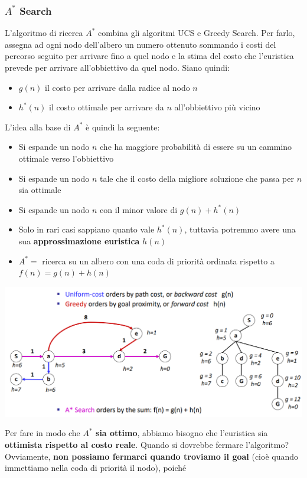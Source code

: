 \documentclass[12pt]{article}
\begin{document}
\subsubsection{$A^*$ Search}
L'algoritmo di ricerca $A^*$ combina gli algoritmi UCS e Greedy Search.
Per farlo, assegna ad ogni nodo dell'albero un numero ottenuto sommando i costi del percorso seguito per arrivare fino a quel nodo e la stima del costo che
l'euristica prevede per arrivare all'obbiettivo da quel nodo.
Siano quindi:
\begin{itemize}
    \item $g(n)$ il costo per arrivare dalla radice al nodo $n$
    \item $h^*(n)$ il costo ottimale per arrivare da $n$ all'obbiettivo più vicino
\end{itemize}
L'idea alla base di $A^*$ è quindi la seguente:
\begin{itemize}
    \item Si espande un nodo $n$ che ha maggiore probabilità di essere su un cammino ottimale verso l'obbiettivo
    \item Si espande un nodo $n$ tale che il costo della migliore soluzione che passa per $n$ sia ottimale
    \item Si espande un nodo $n$ con il minor valore di $g(n) + h^*(n)$ 
    \item Solo in rari casi sappiano quanto vale $h^*(n)$, tuttavia potremmo avere una sua \textbf{approssimazione euristica} $h(n)$
    \item $A^* =$ ricerca su un albero con una coda di priorità ordinata rispetto a $f(n) = g(n) + h(n)$
\end{itemize}
\begin{center}
    \includegraphics[width =1\linewidth]{Images/47.PNG}
\end{center}
Per fare in modo che \textbf{$A^*$ sia ottimo}, abbiamo bisogno che l'euristica sia \textbf{ottimista rispetto al costo reale}.
Quando si dovrebbe fermare l'algoritmo? Ovviamente, \textbf{non possiamo fermarci quando troviamo il goal} (cioè quando immettiamo nella coda di priorità il nodo), poiché
\end{document}
